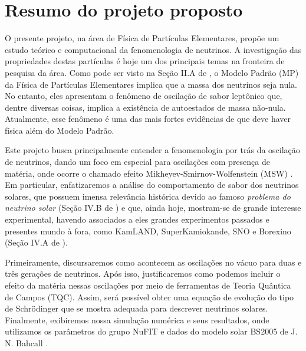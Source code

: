 \documentclass[12pt]{report}
\begin{document}
%
%
\geraTitulo
%
\folhaDeRosto
%
%
%
\tableofcontents
\thispagestyle{empty}
\clearpage
%

\sectionfont{\scshape}

\chapter{Resumo do projeto proposto}\label{chp:resumoProj}

O presente projeto, na área de Física de Partículas Elementares, propõe um estudo teórico e computacional da fenomenologia de neutrinos. A investigação das propriedades destas partículas é hoje um dos principais temas na fronteira de pesquisa da área. Como pode ser visto na Seção II.A de \cite{gonzalez}, o Modelo Padrão (MP) da Física de Partículas Elementares implica que a massa dos neutrinos seja nula. No entanto, eles apresentam o fenômeno de oscilação de sabor leptônico que, dentre diversas coisas, implica a existência de autoestados de massa não-nula. Atualmente, esse fenômeno é uma das mais fortes evidências de que deve haver física além do Modelo Padrão.

Este projeto busca principalmente entender a fenomenologia por trás da oscilação de neutrinos, dando um foco em especial para oscilações com presença de matéria, onde ocorre o chamado efeito Mikheyev-Smirnov-Wolfenstein (MSW) \cite{wolfenstein, smirnov}. Em particular, enfatizaremos a análise do comportamento de sabor dos neutrinos solares, que possuem imensa relevância histórica devido ao famoso \textit{problema do neutrino solar} (Seção IV.B de \cite{gonzalez}) e que, ainda hoje, mostram-se de grande interesse experimental, havendo associados a eles grandes experimentos passados e presentes mundo à fora, como KamLAND, SuperKamiokande, SNO e Borexino (Seção IV.A de \cite{gonzalez}).

Primeiramente, discursaremos como acontecem as oscilações no vácuo para duas e três gerações de neutrinos. Após isso, justificaremos como podemos incluir o efeito da matéria nessas oscilações por meio de ferramentas de Teoria Quântica de Campos (TQC). Assim, será possível obter uma equação de evolução do tipo de Schrödinger que se mostra adequada para descrever neutrinos solares. Finalmente, exibiremos nossa simulação numérica e seus resultados, onde utilizamos os parâmetros do grupo NuFIT \cite{nufit} e dados do modelo solar BS2005 de J. N. Bahcall \cite{bahcall, bahcall-model}.
\end{document}
